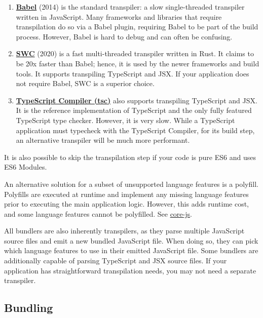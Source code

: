 \documentclass{article}
\begin{document}
\begin{enumerate}
  \item \href{https://babeljs.io/}{\textbf{Babel}} (2014) is the standard transpiler: a slow
    single-threaded transpiler written in JavaScript. Many frameworks and libraries that require
    transpilation do so via a Babel plugin, requiring Babel to be part of the build process.
    However, Babel is hard to debug and can often be confusing.

  \item \href{https://swc.rs/}{\textbf{SWC}} (2020) is a fast multi-threaded transpiler written in
    Rust. It claims to be 20x faster than Babel; hence, it is used by the newer frameworks and build
    tools. It supports transpiling TypeScript and JSX. If your application does not require Babel,
    SWC is a superior choice.

  \item \href{https://github.com/microsoft/TypeScript}{\textbf{TypeScript Compiler (tsc)}} also
    supports transpiling TypeScript and JSX. It is the reference implementation of TypeScript and
    the only fully featured TypeScript type checker. However, it is very slow. While a TypeScript
    application must typecheck with the TypeScript Compiler, for its build step, an alternative
    transpiler will be much more performant.
\end{enumerate}

It is also possible to skip the transpilation step if your code is pure ES6 and uses ES6 Modules.

An alternative solution for a subset of unsupported language features is a polyfill. Polyfills are
executed at runtime and implement any missing language features prior to executing the main
application logic. However, this adds runtime cost, and some language features cannot be polyfilled.
See \href{https://github.com/zloirock/core-js}{core-js}.

All bundlers are also inherently transpilers, as they parse multiple JavaScript source files and
emit a new bundled JavaScript file. When doing so, they can pick which language features to use in
their emitted JavaScript file. Some bundlers are additionally capable of parsing TypeScript and JSX
source files. If your application has straightforward transpilation needs, you may not need a
separate transpiler.

\subsection{Bundling}
\end{document}
